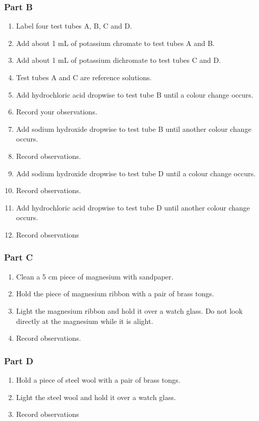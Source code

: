 		\subsubsection{Part B}
			\begin{enumerate}
				\item Label four test tubes A, B, C and D.
				\item Add about 1 mL of potassium chromate to test tubes A and B.
				\item Add about 1 mL of potassium dichromate to test tubes C and D.
				\item Test tubes A and C are reference solutions.
				\item Add hydrochloric acid dropwise to test tube B until a colour change occurs.
				\item Record your observations.
				\item Add sodium hydroxide dropwise to test tube B until another colour change occurs.
				\item Record observations.
				\item Add sodium hydroxide dropwise to test tube D until a colour change occurs. 
				\item Record observations.
				\item Add hydrochloric acid dropwise to test tube D until another colour change occurs.
				\item Record observations
			\end{enumerate}

			\subsubsection{Part C}
				\begin{enumerate}
					\item Clean a 5 cm piece of magnesium with sandpaper.
					\item Hold the piece of magnesium ribbon with a pair of brass tongs.
					\item Light the magnesium ribbon and hold it over a watch glass. Do not look directly at the magnesium while it is alight.
					\item Record observations.
				\end{enumerate}

			\subsubsection{Part D}
				\begin{enumerate}
					\item Hold a piece of steel wool with a pair of brass tongs.
					\item Light the steel wool and hold it over a watch glass.
					\item Record observations
				\end{enumerate}

